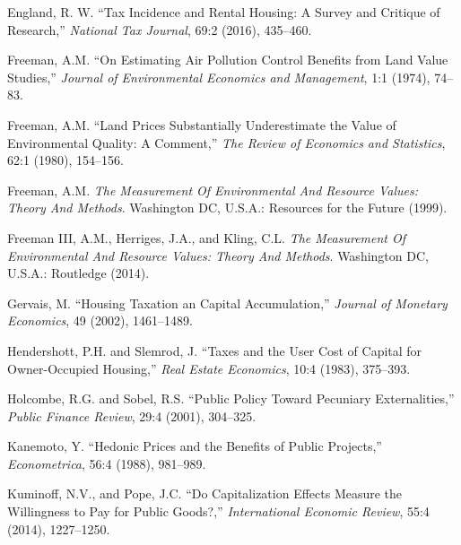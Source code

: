 \documentclass[ecta,nameyear,draft]{econsocart}
\theoremstyle{plain}
\theoremstyle{remark}
\begin{document}
\begin{thebibliography}{}
\textup{England, R. W. } %
``Tax Incidence and Rental Housing: A Survey and Critique of Research,''
\textit{National Tax Journal}, 69:2 (2016), 435--460.
\endbibitem

\textup{Freeman, A.M.} %
``On Estimating Air Pollution Control Benefits from Land Value Studies,''
\textit{Journal of Environmental Economics and Management}, 1:1 (1974), 74--83.
\endbibitem

\textup{Freeman, A.M.} %
``Land Prices Substantially Underestimate the Value of Environmental Quality: A Comment,''
\textit{The Review of Economics and Statistics}, 62:1 (1980), 154--156.
\endbibitem


\textup{Freeman, A.M.} %
\textit{The Measurement Of Environmental And Resource Values: Theory And Methods}.
Washington DC, U.S.A.: Resources for the Future (1999).
\endbibitem
 
\textup{Freeman III, A.M., Herriges, J.A., and Kling, C.L.} %
\textit{The Measurement Of Environmental And Resource Values: Theory And Methods}.
Washington DC, U.S.A.: Routledge (2014).
\endbibitem 

\textup{Gervais, M.} %
``Housing Taxation an Capital Accumulation,''
\textit{Journal of Monetary Economics}, 49 (2002), 1461--1489.
\endbibitem

\textup{Hendershott, P.H. and Slemrod, J.} %
``Taxes and the User Cost of Capital for Owner-Occupied Housing,''
\textit{Real Estate Economics}, 10:4 (1983), 375--393.
\endbibitem

\textup{Holcombe, R.G. and Sobel, R.S.} %
``Public Policy Toward Pecuniary Externalities,''
\textit{Public Finance Review}, 29:4 (2001), 304--325.
\endbibitem

\textup{Kanemoto, Y.} %
``Hedonic Prices and the Benefits of Public Projects,''
\textit{Econometrica}, 56:4 (1988), 981--989.
\endbibitem

\textup{Kuminoff, N.V., and Pope, J.C.} %
``Do Capitalization Effects Measure the Willingness to Pay for Public Goods?,''
\textit{International Economic Review}, 55:4 (2014), 1227--1250.
\endbibitem


\end{thebibliography}
\end{document}
